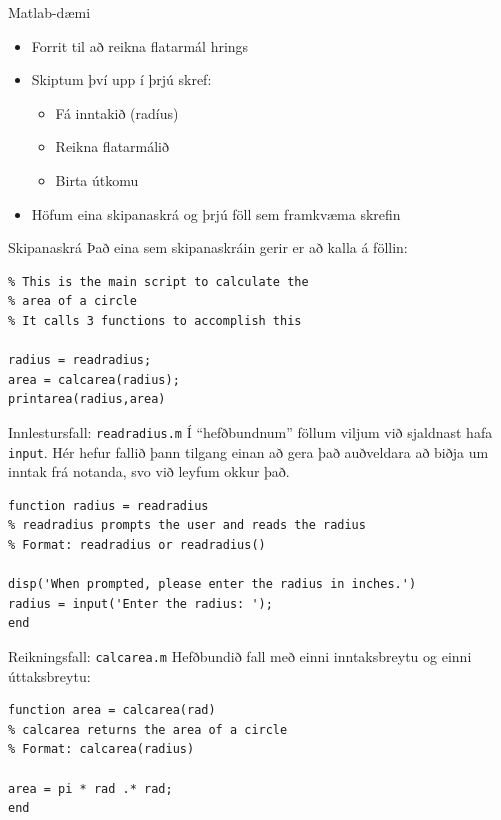 \documentclass{beamer}
\begin{document}
\begin{frame}{Matlab-dæmi}
\begin{itemize}
 \item Forrit til að reikna flatarmál hrings
 \item Skiptum því upp í þrjú skref:
 \begin{itemize}
  \item Fá inntakið (radíus)
  \item Reikna flatarmálið
  \item Birta útkomu
 \end{itemize}
 \item Höfum eina skipanaskrá og þrjú föll sem framkvæma skrefin
\end{itemize}
\end{frame}

\begin{frame}[fragile]{Skipanaskrá}
Það eina sem skipanaskráin gerir er að kalla á föllin:

\begin{verbatim}
% This is the main script to calculate the
% area of a circle
% It calls 3 functions to accomplish this

radius = readradius;
area = calcarea(radius);
printarea(radius,area)
\end{verbatim}
\end{frame}

\begin{frame}[fragile]{Innlestursfall: \texttt{readradius.m}}
\vspace{\baselineskip}
Í ``hefðbundnum'' föllum viljum við sjaldnast hafa \texttt{input}. Hér hefur fallið þann tilgang einan að gera það auðveldara að biðja um inntak frá notanda, svo við leyfum okkur það.

\begin{verbatim}
function radius = readradius
% readradius prompts the user and reads the radius
% Format: readradius or readradius()

disp('When prompted, please enter the radius in inches.')
radius = input('Enter the radius: ');
end
\end{verbatim}
\end{frame}

\begin{frame}[fragile]{Reikningsfall: \texttt{calcarea.m}}
\vspace{\baselineskip}
Hefðbundið fall með einni inntaksbreytu og einni úttaksbreytu:

\begin{verbatim}
function area = calcarea(rad)
% calcarea returns the area of a circle
% Format: calcarea(radius)

area = pi * rad .* rad;
end
\end{verbatim}
\end{frame}
\end{document}

